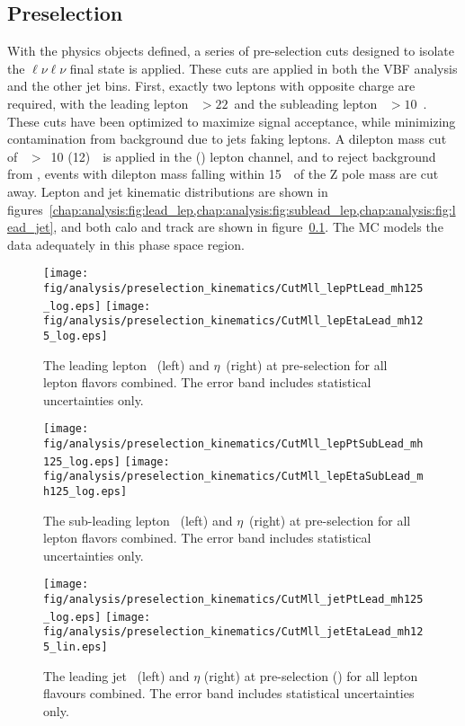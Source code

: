 \subsection{Preselection}

With the physics objects defined, a series of pre-selection cuts
designed to isolate the $\ell\nu\ell\nu$ final state is applied. These
cuts are applied in both the VBF analysis and the other jet
bins. First, exactly two leptons with opposite charge are required,
with the leading lepton \pt~$>22$~\gev and the subleading lepton
\pt~$>10$~\gev. These cuts have been optimized to maximize signal
acceptance, while minimizing contamination from background due to jets
faking leptons. A dilepton mass cut of
\mll~$>$~10 (12)~\gev~is applied in the \emme (\eemm) lepton channel,
and to reject background from \ZDY, events with dilepton mass falling
within 15~\gev~of the Z pole mass are cut away. Lepton and jet
kinematic distributions are shown in
figures~\ref{chap:analysis:fig:lead_lep,chap:analysis:fig:sublead_lep,chap:analysis:fig:lead_jet},
and both calo and track \etmiss are shown in figure~\ref{}. The MC models the data
adequately in this phase space region. 

\begin{figure}[h]
\centering
\texttt{[image: fig/analysis/preselection\_kinematics/CutMll\_lepPtLead\_mh125\_log.eps]}
\texttt{[image: fig/analysis/preselection\_kinematics/CutMll\_lepEtaLead\_mh125\_log.eps]}
\caption{The leading lepton \pt~(left) and $\eta$~(right) at
  pre-selection for all lepton flavors combined. The error band
  includes statistical uncertainties only.}
\label{chap:analysis:fig:lead_lep}
\end{figure}

\begin{figure}[h]
\centering
\texttt{[image: fig/analysis/preselection\_kinematics/CutMll\_lepPtSubLead\_mh125\_log.eps]}
\texttt{[image: fig/analysis/preselection\_kinematics/CutMll\_lepEtaSubLead\_mh125\_log.eps]}
\caption{The sub-leading lepton \pt~(left) and $\eta$~(right) at
  pre-selection for all lepton flavors combined. The error band
  includes statistical uncertainties only.}
\label{chap:analysis:fig:sublead_lep}
\end{figure}

\begin{figure}[h]
\centering
\texttt{[image: fig/analysis/preselection\_kinematics/CutMll\_jetPtLead\_mh125\_log.eps]}
\texttt{[image: fig/analysis/preselection\_kinematics/CutMll\_jetEtaLead\_mh125\_lin.eps]}
\caption{The leading jet \pt~(left) and $\eta$ (right) at pre-selection (\mll) for all lepton flavours combined. The
error band includes statistical uncertainties only.}
\label{chap:analysis:fig:lead_jet}
\end{figure}

